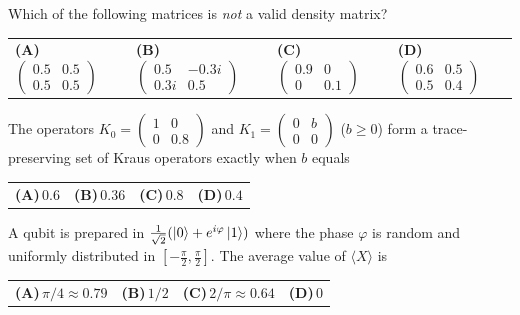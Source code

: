 \documentclass[11pt,a4paper]{article}
\newcommand{\optlabel}[1]{\textbf{(#1)}}
\newenvironment{qitem}[1]{\begin{list}{}{\setlength{\leftmargin}{3.3em}\setlength{\labelwidth}{3.1em}%
  \setlength{\labelsep}{0.2em}\setlength{\topsep}{3pt}\setlength{\parsep}{3pt}}\item[\textbf{Q.#1}\hfill]}{\end{list}}
\newcommand{\qsep}{\par\vspace{2pt}{\color{black!15}\hrule}\vspace{4pt}}
\begin{document}
\begin{qitem}{4}
Which of the following matrices is \emph{not} a valid density matrix?
\par\smallskip\noindent\begin{tabularx}{\linewidth}{@{}*{4}{L}@{}}
\optlabel{A}\,$\begin{pmatrix}0.5 & 0.5\\ 0.5 & 0.5\end{pmatrix}$ & \optlabel{B}\,$\begin{pmatrix}0.5 & -0.3i\\ 0.3i & 0.5\end{pmatrix}$ & \optlabel{C}\,$\begin{pmatrix}0.9 & 0\\ 0 & 0.1\end{pmatrix}$ & \optlabel{D}\,$\begin{pmatrix}0.6 & 0.5\\ 0.5 & 0.4\end{pmatrix}$
\end{tabularx}
\end{qitem}
\qsep

\begin{qitem}{5}
The operators $K_0 = \begin{pmatrix}1 & 0\\ 0 & 0.8\end{pmatrix}$ and $K_1 = \begin{pmatrix}0 & b\\ 0 & 0\end{pmatrix}$ ($b \ge 0$) form a
trace-preserving set of Kraus operators exactly when $b$ equals
\par\smallskip\noindent\begin{tabularx}{\linewidth}{@{}*{4}{L}@{}}
\optlabel{A}\,$0.6$ & \optlabel{B}\,$0.36$ & \optlabel{C}\,$0.8$ & \optlabel{D}\,$0.4$
\end{tabularx}
\end{qitem}
\qsep

\begin{qitem}{6}
A qubit is prepared in $\frac{1}{\sqrt2}(\ket0 + e^{i\varphi}\ket1)$ where the phase $\varphi$ is random and uniformly distributed in
$[-\frac\pi2, \frac\pi2]$. The average value of $\langle X\rangle$ is
\par\smallskip\noindent\begin{tabularx}{\linewidth}{@{}*{4}{L}@{}}
\optlabel{A}\,$\pi/4 \approx 0.79$ & \optlabel{B}\,$1/2$ & \optlabel{C}\,$2/\pi \approx 0.64$ & \optlabel{D}\,$0$
\end{tabularx}
\end{qitem}
\qsep
\end{document}
